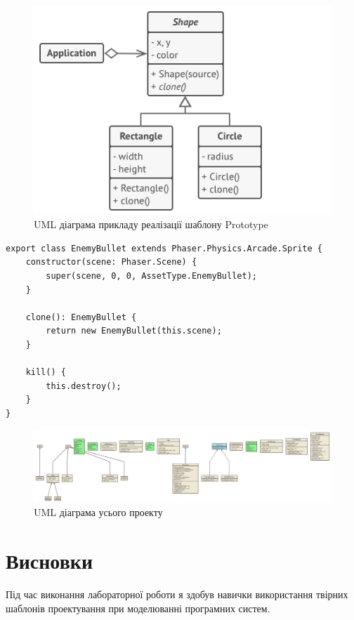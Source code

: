 \documentclass[oneside,14pt]{extarticle}
\begin{document}
\begin{normalsize}
		\begin{figure}[H]
		\centering
		\includegraphics{prototype-ex}
		\caption{UML діаграма прикладу реалізації шаблону Prototype}
	\end{figure}
	
	\begin{small}
		\begin{lstlisting}
export class EnemyBullet extends Phaser.Physics.Arcade.Sprite {
	constructor(scene: Phaser.Scene) {
		super(scene, 0, 0, AssetType.EnemyBullet);
	}
	
	clone(): EnemyBullet {
		return new EnemyBullet(this.scene);
	}
	
	kill() {
		this.destroy();
	}
}
		\end{lstlisting}
	\end{small}
	
	\begin{figure}[H]
		\centering
		\includegraphics[width=\textwidth]{out}
		\caption{UML діаграма усього проекту}
	\end{figure}
	
	\section*{Висновки}
	   Під час виконання лабораторної роботи я здобув навички використання твірних шаблонів проектування при моделюванні програмних систем.
\end{normalsize}
\end{document}
